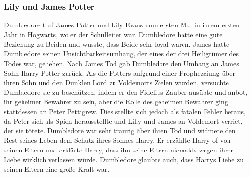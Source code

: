 \documentclass[a4paper, 10pt]{article}
\begin{document}
\subsubsection*{\large Lily und James Potter}
Dumbledore traf James Potter und Lily Evans zum ersten Mal in ihrem ersten Jahr in Hogwarts, wo er der Schulleiter war. Dumbledore hatte eine gute Beziehung zu Beiden und wusste, dass Beide sehr loyal waren. James hatte Dumbledore seinen Unsichtbarkeitsumhang, der eines der drei Heiligtümer des Todes war, geliehen. Nach James Tod gab Dumbledore den Umhang an James Sohn Harry Potter
zurück.
\vspace{10pt}
\newline
Als die Potters aufgrund einer Prophezeiung über ihren Sohn und den Dunklen Lord zu Voldemorts Zielen wurden, versuchte Dumbledore sie zu beschützen, indem er den Fidelius-Zauber ausübte und anbot, ihr geheimer Bewahrer zu sein, aber die Rolle des geheimen Bewahrer ging stattdessen an Peter Pettigrew. Dies stellte sich jedoch als fatalen Fehler heraus, da Peter sich als Spion herausstellte und Lilly und James an Voldemort verriet, der sie tötete. Dumbledore war sehr traurig über ihren Tod und widmete den Rest seines Leben dem Schutz ihres Sohnes Harry. Er erzählte Harry of von seinen Eltern und erklärte Harry, dass ihn seine Eltern niemalds wegen ihrer Liebe wirklich verlassen würde. Dumbledore glaubte auch, dass Harrys Liebe zu seinen Eltern eine große Kraft war.
\end{document}
